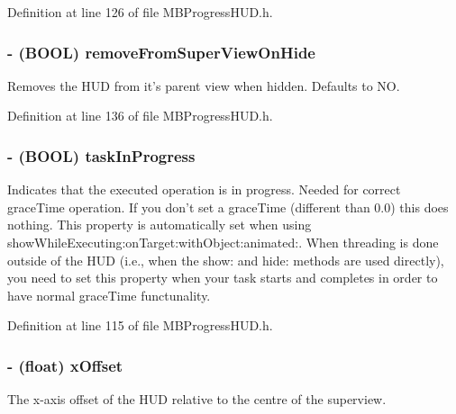 Definition at line 126 of file MBProgressHUD.h.

\hypertarget{interface_m_b_progress_h_u_d_ae941fefd3aee82dc342657b52edb1e2b}{
\subsubsection[{removeFromSuperViewOnHide}]{\setlength{\rightskip}{0pt plus 5cm}-\/ (BOOL) removeFromSuperViewOnHide}}
\label{interface_m_b_progress_h_u_d_ae941fefd3aee82dc342657b52edb1e2b}
Removes the HUD from it's parent view when hidden. Defaults to NO. 

Definition at line 136 of file MBProgressHUD.h.

\hypertarget{interface_m_b_progress_h_u_d_a283d5cb9a069816a9a0406bc90d79a25}{
\subsubsection[{taskInProgress}]{\setlength{\rightskip}{0pt plus 5cm}-\/ (BOOL) taskInProgress}}
\label{interface_m_b_progress_h_u_d_a283d5cb9a069816a9a0406bc90d79a25}
Indicates that the executed operation is in progress. Needed for correct graceTime operation. If you don't set a graceTime (different than 0.0) this does nothing. This property is automatically set when using showWhileExecuting:onTarget:withObject:animated:. When threading is done outside of the HUD (i.e., when the show: and hide: methods are used directly), you need to set this property when your task starts and completes in order to have normal graceTime functunality. 

Definition at line 115 of file MBProgressHUD.h.

\hypertarget{interface_m_b_progress_h_u_d_a4c9cc7a344711c6782bfad7ce9e12bb7}{
\subsubsection[{xOffset}]{\setlength{\rightskip}{0pt plus 5cm}-\/ (float) xOffset}}
\label{interface_m_b_progress_h_u_d_a4c9cc7a344711c6782bfad7ce9e12bb7}
The x-\/axis offset of the HUD relative to the centre of the superview. 

